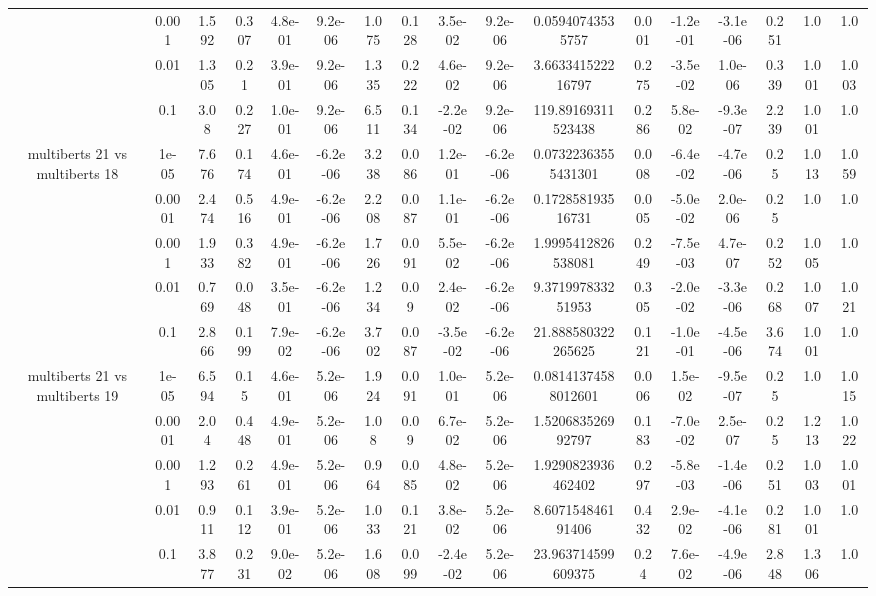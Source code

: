 \begin{tabular}{|c|c|c|c|c|c|c|c|c|c|c|c|c|c|c|c|c|}
 & 0.001 & 1.592 & 0.307 & 4.8e-01 & 9.2e-06 & 1.075 & 0.128 & 3.5e-02 & 9.2e-06 & 0.05940743535757 & 0.001 & -1.2e-01 & -3.1e-06 & 0.251 & 1.0 & 1.0 \\
 & 0.01 & 1.305 & 0.21 & 3.9e-01 & 9.2e-06 & 1.335 & 0.222 & 4.6e-02 & 9.2e-06 & 3.663341522216797 & 0.275 & -3.5e-02 & 1.0e-06 & 0.339 & 1.001 & 1.003 \\
 & 0.1 & 3.08 & 0.227 & 1.0e-01 & 9.2e-06 & 6.511 & 0.134 & -2.2e-02 & 9.2e-06 & 119.89169311523438 & 0.286 & 5.8e-02 & -9.3e-07 & 2.239 & 1.001 & 1.0 \\
\hline
\multirow{5}{*}{multiberts 21 vs multiberts 18} & 1e-05 & 7.676 & 0.174 & 4.6e-01 & -6.2e-06 & 3.238 & 0.086 & 1.2e-01 & -6.2e-06 & 0.07322363555431301 & 0.008 & -6.4e-02 & -4.7e-06 & 0.25 & 1.013 & 1.059 \\
 & 0.0001 & 2.474 & 0.516 & 4.9e-01 & -6.2e-06 & 2.208 & 0.087 & 1.1e-01 & -6.2e-06 & 0.172858193516731 & 0.005 & -5.0e-02 & 2.0e-06 & 0.25 & 1.0 & 1.0 \\
 & 0.001 & 1.933 & 0.382 & 4.9e-01 & -6.2e-06 & 1.726 & 0.091 & 5.5e-02 & -6.2e-06 & 1.9995412826538081 & 0.249 & -7.5e-03 & 4.7e-07 & 0.252 & 1.005 & 1.0 \\
 & 0.01 & 0.769 & 0.048 & 3.5e-01 & -6.2e-06 & 1.234 & 0.09 & 2.4e-02 & -6.2e-06 & 9.371997833251953 & 0.305 & -2.0e-02 & -3.3e-06 & 0.268 & 1.007 & 1.021 \\
 & 0.1 & 2.866 & 0.199 & 7.9e-02 & -6.2e-06 & 3.702 & 0.087 & -3.5e-02 & -6.2e-06 & 21.888580322265625 & 0.121 & -1.0e-01 & -4.5e-06 & 3.674 & 1.001 & 1.0 \\
\hline
\multirow{5}{*}{multiberts 21 vs multiberts 19} & 1e-05 & 6.594 & 0.15 & 4.6e-01 & 5.2e-06 & 1.924 & 0.091 & 1.0e-01 & 5.2e-06 & 0.08141374588012601 & 0.006 & 1.5e-02 & -9.5e-07 & 0.25 & 1.0 & 1.015 \\
 & 0.0001 & 2.04 & 0.448 & 4.9e-01 & 5.2e-06 & 1.08 & 0.09 & 6.7e-02 & 5.2e-06 & 1.520683526992797 & 0.183 & -7.0e-02 & 2.5e-07 & 0.25 & 1.213 & 1.022 \\
 & 0.001 & 1.293 & 0.261 & 4.9e-01 & 5.2e-06 & 0.964 & 0.085 & 4.8e-02 & 5.2e-06 & 1.9290823936462402 & 0.297 & -5.8e-03 & -1.4e-06 & 0.251 & 1.003 & 1.001 \\
 & 0.01 & 0.911 & 0.112 & 3.9e-01 & 5.2e-06 & 1.033 & 0.121 & 3.8e-02 & 5.2e-06 & 8.607154846191406 & 0.432 & 2.9e-02 & -4.1e-06 & 0.281 & 1.001 & 1.0 \\
 & 0.1 & 3.877 & 0.231 & 9.0e-02 & 5.2e-06 & 1.608 & 0.099 & -2.4e-02 & 5.2e-06 & 23.963714599609375 & 0.24 & 7.6e-02 & -4.9e-06 & 2.848 & 1.306 & 1.0 \\

\end{tabular}
